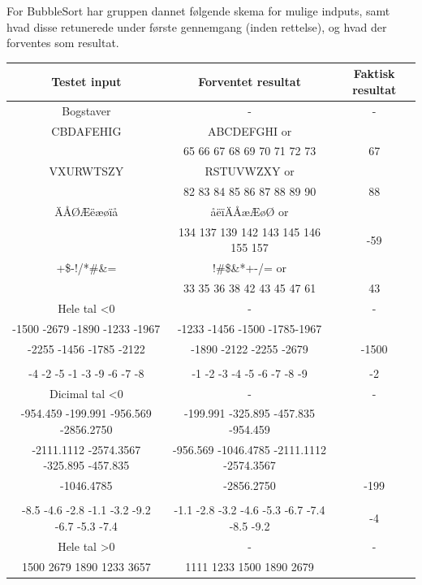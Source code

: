 \documentclass[11pt]{article}
\begin{document}
    \newpage \noindent
    For BubbleSort har gruppen dannet følgende skema for mulige indputs, samt hvad disse retunerede under første gennemgang (inden rettelse), og hvad der forventes som resultat.
    \begin{center}
        \begin{tabular}{ |c|c|c| } 
            \hline
             Testet input & Forventet resultat & Faktisk resultat \\
            \hline
             Bogstaver & - & - \\
              CBDAFEHIG & ABCDEFGHI or & \\ 
              &65 66 67 68 69 70 71 72 73 & 67 \\
              VXURWTSZY & RSTUVWZXY or & \\ 
              & 82 83 84 85 86 87 88 89 90 & 88 \\
              ÄÅØÆëæøïå & åëïÄÅæÆøØ or & \\ 
              & 134 137 139 142 143 145 146 155 157 & -59 \\
              +\$-!/*\#\&= & !\#\$\&*+-/= or & \\
              & 33 35 36 38 42 43 45 47 61 & 43 \\
             Hele tal \textless 0 & - & - \\
              -1500 -2679 -1890 -1233 -1967 & -1233 -1456 -1500 -1785-1967 & \\
              -2255 -1456 -1785 -2122 & -1890 -2122 -2255 -2679 & -1500\\ 
              &&\\
              -4 -2 -5 -1 -3 -9 -6 -7 -8 & -1 -2 -3 -4 -5 -6 -7 -8 -9 & -2\\ 
             Dicimal tal \textless 0 & - & -\\
              -954.459 -199.991 -956.569 -2856.2750 & -199.991 -325.895 -457.835 -954.459 & \\
              -2111.1112 -2574.3567 -325.895 -457.835 & -956.569 -1046.4785 -2111.1112 -2574.3567 & \\ 
              -1046.4785 & -2856.2750 & -199 \\ 
              &&\\
              -8.5 -4.6 -2.8 -1.1 -3.2 -9.2 -6.7 -5.3 -7.4 & -1.1 -2.8 -3.2 -4.6 -5.3 -6.7 -7.4 -8.5 -9.2 & -4\\ 
             Hele tal \textgreater 0 & - & - \\
              1500 2679 1890 1233 3657 & 1111 1233 1500 1890 2679 & \\ 

\end{tabular}
\end{center}
\end{document}
